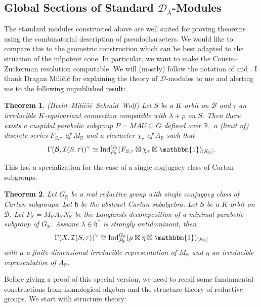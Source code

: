 \documentclass[letterpaper,twosided,11pt]{article}
\theoremstyle{plain}
\newtheorem{theorem}{Theorem}[section]
\theoremstyle{definition}
\theoremstyle{remark}
\newcommand{\R}{\mathbb{R}}
\newcommand{\Ind}{\operatorname{Ind}}
\newcommand{\lie}[1]{\mathfrak{#1}}
\begin{document}

\subsection{Global Sections of Standard $ \mathcal{D}_\lambda $-Modules}

The standard modules constructed above are well suited for proving
theorems using the combinatorial description of pseudocharacters.  We
would like to compare this to the geometric construction which can be
best adapted to the situation of the nilpotent cone.  In particular, we
want to make the Cousin--Zuckerman resolution computable.  We will (mostly)
follow the notation of
\cite{Hecht1987} and
\cite{Hecht2022}.  I thank Dragan Mili\v{c}i\'{c} for explaining the
theory of $ \mathcal{D} $-modules to me and alerting me to the following
unpublished result:

\begin{theorem}(Hecht--Mili\v{c}i\'{c}--Schmid--Wolf) 
    \label{Global_Sections_from_D} Let $ S $ be a $ K $-orbit on $
    \mathcal{B} $ and $ \tau $ an irreducible $ K $-equivariant
    connection compatible with $ \lambda+\rho $ on $ S. $ Then there
    exists a cuspidal parabolic subgroup $ P=MAU\subseteq G $ defined
    over $ \R, $ a (limit of) discrete series $ F_{S,\tau} $ of $ M_\R $
    and a character $ \chi_\tau $ of $ A_\R $ such that
    \[
        \Gamma(\mathcal{B}, \mathcal{I}(S,\tau))^\vee \simeq \Ind_{P_\R}^
        {G_\R}(F_{S,\tau}\boxtimes \chi_\tau \boxtimes \mathbbm{1})_{[K_\R]}.
    \]

\end{theorem}

This has a specialization for the case of a single conjugacy class of
Cartan subgroups.

\begin{theorem}\label{Single_Conjugacy_Class_Sections} 
    Let $ G_\R $ be a real reductive group with single conjugacy class
    of Cartan subgroups.  Let $ \lie{h} $ be the abstract Cartan
    subalgebra.  Let $ S $ be a $ K $-orbit on $ \mathcal{B}. $ Let $ P_\R=M_\R
    A_\R N_\R $ be the Langlands decomposition of a minimal parabolic
    subgroup of $ G_\R. $ Assume $ \lambda\in \lie{h}^* $ is strongly
    antidominant, then
    \[
        \Gamma(X,\mathcal{I}(S,\tau))^\vee\cong \Ind_{P_\R}^{G_\R}(\mu\boxtimes
        \eta\boxtimes \mathbbm{1})_{[K_\R]}
    \]
    with $ \mu $ a finite dimensional irreducible representation of $ M_\R
    $ and $ \eta $ an irreducible representation of $ A_\R. $
\end{theorem}
Before giving a proof of this special version, we need to recall some
 fundamental constructions from homological algebra and the structure 
 theory of reductive groups. We start with structure theory: 
 
\end{document}
